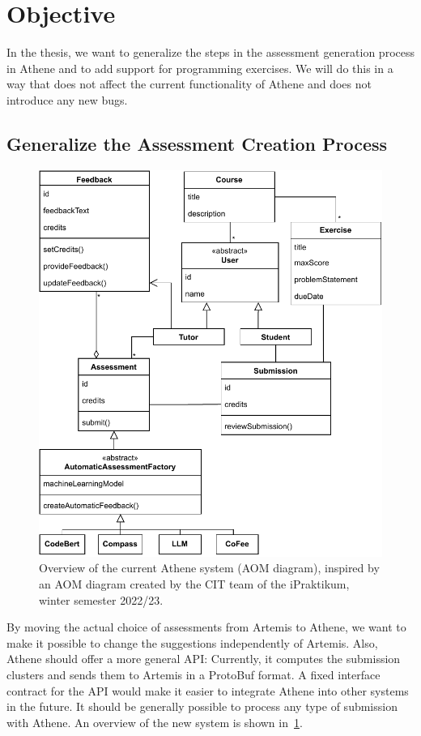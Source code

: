 \section{Objective}
In the thesis, we want to generalize the steps in the assessment generation process in Athene and to add support for programming exercises. We will do this in a way that does not affect the current functionality of Athene and does not introduce any new bugs.


\subsection{Generalize the Assessment Creation Process}
\begin{figure}[ht]
    \centering
    \includegraphics[width=0.8\linewidth]{figures/proposal/aom.pdf}
    \caption{Overview of the current Athene system (AOM diagram), inspired by an AOM diagram created by the CIT team of the iPraktikum, winter semester 2022/23.}
    \label{fig:aom}
\end{figure}
By moving the actual choice of assessments from Artemis to Athene, we want to make it possible to change the suggestions independently of Artemis. Also, Athene should offer a more general API: Currently, it computes the submission clusters and sends them to Artemis in a ProtoBuf format. A fixed interface contract for the API would make it easier to integrate Athene into other systems in the future. It should be generally possible to process any type of submission with Athene. An overview of the new system is shown in~\cref{fig:aom}.
